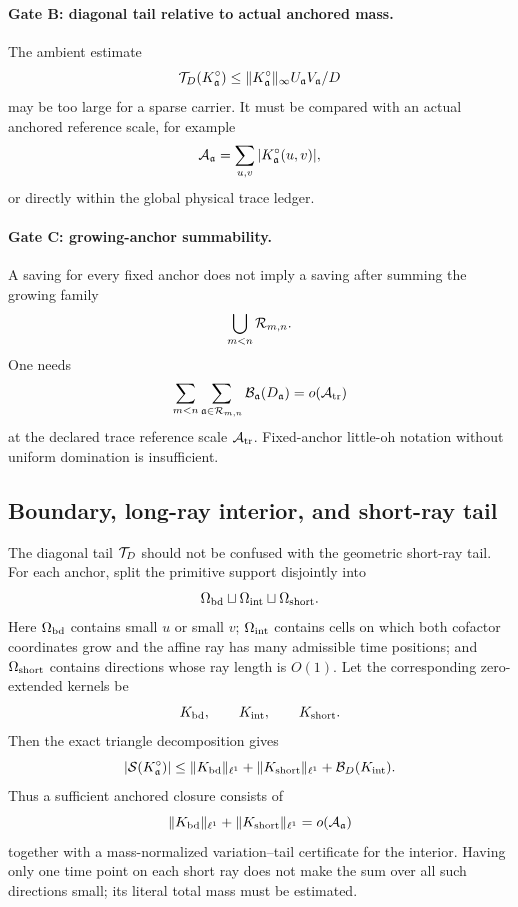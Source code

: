 \paragraph{Gate B: diagonal tail relative to actual anchored mass.}
The ambient estimate
\[
 \mathcal T_D(K^\circ_{\mathfrak a})
 \le
 \|K^\circ_{\mathfrak a}\|_\infty
 U_{\mathfrak a}V_{\mathfrak a}/D
\]
may be too large for a sparse carrier.  It must be compared with an actual
anchored reference scale, for example
\[
 \mathcal A_{\mathfrak a}
 =
 \sum_{u,v}|K^\circ_{\mathfrak a}(u,v)|,
\]
or directly within the global physical trace ledger.

\paragraph{Gate C: growing-anchor summability.}
A saving for every fixed anchor does not imply a saving after summing the
growing family
\[
 \bigcup_{m<n}\mathcal R_{m,n}.
\]
One needs
\[
 \sum_{m<n}\sum_{\mathfrak a\in\mathcal R_{m,n}}
 \mathcal B_{\mathfrak a}(D_{\mathfrak a})
 =
 o(\mathcal A_{\rm tr})
\]
at the declared trace reference scale \(\mathcal A_{\rm tr}\).  Fixed-anchor
little-oh notation without uniform domination is insufficient.

\subsection{Boundary, long-ray interior, and short-ray tail}

The diagonal tail \(\mathcal T_D\) should not be confused with the geometric
short-ray tail.  For each anchor, split the primitive support disjointly
into
\[
 \Omega_{\rm bd}\sqcup\Omega_{\rm int}\sqcup\Omega_{\rm short}.
\]
Here \(\Omega_{\rm bd}\) contains small \(u\) or small \(v\);
\(\Omega_{\rm int}\) contains cells on which both cofactor coordinates
grow and the affine ray has many admissible time positions; and
\(\Omega_{\rm short}\) contains directions whose ray length is \(O(1)\).
Let the corresponding zero-extended kernels be
\[
 K_{\rm bd},\qquad K_{\rm int},\qquad K_{\rm short}.
\]
Then the exact triangle decomposition gives
\begin{equation}
 |\mathcal S(K^\circ_{\mathfrak a})|
 \le
 \|K_{\rm bd}\|_{\ell^1}
 +\|K_{\rm short}\|_{\ell^1}
 +\mathcal B_D(K_{\rm int}).
\label{eq:boundary-interior-short}
\end{equation}
Thus a sufficient anchored closure consists of
\[
 \|K_{\rm bd}\|_{\ell^1}
 +\|K_{\rm short}\|_{\ell^1}
 =o(\mathcal A_{\mathfrak a})
\]
together with a mass-normalized variation--tail certificate for the
interior.  Having only one time point on each short ray does not make the
sum over all such directions small; its literal total mass must be
estimated.

